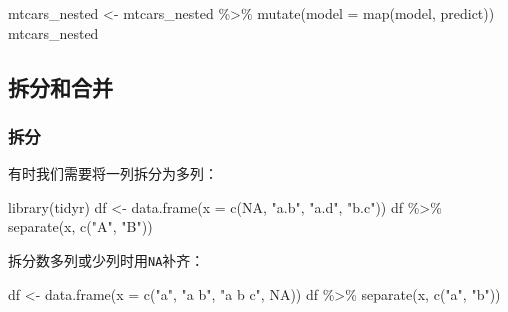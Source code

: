 \documentclass[
]{book}
\newenvironment{Shaded}{\begin{snugshade}}{\end{snugshade}}
\newcommand{\AttributeTok}[1]{\textcolor[rgb]{0.77,0.63,0.00}{#1}}
\newcommand{\ConstantTok}[1]{\textcolor[rgb]{0.00,0.00,0.00}{#1}}
\newcommand{\FunctionTok}[1]{\textcolor[rgb]{0.00,0.00,0.00}{#1}}
\newcommand{\NormalTok}[1]{#1}
\newcommand{\OtherTok}[1]{\textcolor[rgb]{0.56,0.35,0.01}{#1}}
\newcommand{\SpecialCharTok}[1]{\textcolor[rgb]{0.00,0.00,0.00}{#1}}
\newcommand{\StringTok}[1]{\textcolor[rgb]{0.31,0.60,0.02}{#1}}
\begin{document}
\begin{Shaded}
\begin{Highlighting}[]
\NormalTok{mtcars\_nested }\OtherTok{\textless{}{-}}\NormalTok{ mtcars\_nested }\SpecialCharTok{\%\textgreater{}\%} 
  \FunctionTok{mutate}\NormalTok{(}\AttributeTok{model =} \FunctionTok{map}\NormalTok{(model, predict))}
\NormalTok{mtcars\_nested  }
\end{Highlighting}
\end{Shaded}

\hypertarget{ux62c6ux5206ux548cux5408ux5e76}{%
\subsection{拆分和合并}\label{ux62c6ux5206ux548cux5408ux5e76}}

\hypertarget{ux62c6ux5206}{%
\subsubsection{拆分}\label{ux62c6ux5206}}

有时我们需要将一列拆分为多列：

\begin{Shaded}
\begin{Highlighting}[]
\FunctionTok{library}\NormalTok{(tidyr)}
\NormalTok{df }\OtherTok{\textless{}{-}} \FunctionTok{data.frame}\NormalTok{(}\AttributeTok{x =} \FunctionTok{c}\NormalTok{(}\ConstantTok{NA}\NormalTok{, }\StringTok{"a.b"}\NormalTok{, }\StringTok{"a.d"}\NormalTok{, }\StringTok{"b.c"}\NormalTok{))}
\NormalTok{df }\SpecialCharTok{\%\textgreater{}\%} \FunctionTok{separate}\NormalTok{(x, }\FunctionTok{c}\NormalTok{(}\StringTok{"A"}\NormalTok{, }\StringTok{"B"}\NormalTok{))}
\end{Highlighting}
\end{Shaded}

拆分数多列或少列时用\texttt{NA}补齐：

\begin{Shaded}
\begin{Highlighting}[]
\NormalTok{df }\OtherTok{\textless{}{-}} \FunctionTok{data.frame}\NormalTok{(}\AttributeTok{x =} \FunctionTok{c}\NormalTok{(}\StringTok{"a"}\NormalTok{, }\StringTok{"a b"}\NormalTok{, }\StringTok{"a b c"}\NormalTok{, }\ConstantTok{NA}\NormalTok{))}
\NormalTok{df }\SpecialCharTok{\%\textgreater{}\%} \FunctionTok{separate}\NormalTok{(x, }\FunctionTok{c}\NormalTok{(}\StringTok{"a"}\NormalTok{, }\StringTok{"b"}\NormalTok{))}
\end{Highlighting}
\end{Shaded}
\end{document}

